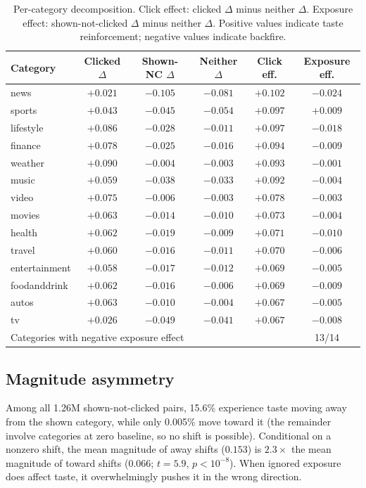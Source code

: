 \documentclass[11pt]{article}
\begin{document}
\begin{table}[ht]
\centering
\caption{Per-category decomposition. Click effect: clicked $\Delta$ minus neither $\Delta$. Exposure effect: shown-not-clicked $\Delta$ minus neither $\Delta$. Positive values indicate taste reinforcement; negative values indicate backfire.}
\label{tab:percat}
\small
\begin{tabular}{lccccc}
\toprule
Category & Clicked $\Delta$ & Shown-NC $\Delta$ & Neither $\Delta$ & Click eff. & Exposure eff. \\
\midrule
news & $+0.021$ & $-0.105$ & $-0.081$ & $+0.102$ & $-0.024$ \\
sports & $+0.043$ & $-0.045$ & $-0.054$ & $+0.097$ & $+0.009$ \\
lifestyle & $+0.086$ & $-0.028$ & $-0.011$ & $+0.097$ & $-0.018$ \\
finance & $+0.078$ & $-0.025$ & $-0.016$ & $+0.094$ & $-0.009$ \\
weather & $+0.090$ & $-0.004$ & $-0.003$ & $+0.093$ & $-0.001$ \\
music & $+0.059$ & $-0.038$ & $-0.033$ & $+0.092$ & $-0.004$ \\
video & $+0.075$ & $-0.006$ & $-0.003$ & $+0.078$ & $-0.003$ \\
movies & $+0.063$ & $-0.014$ & $-0.010$ & $+0.073$ & $-0.004$ \\
health & $+0.062$ & $-0.019$ & $-0.009$ & $+0.071$ & $-0.010$ \\
travel & $+0.060$ & $-0.016$ & $-0.011$ & $+0.070$ & $-0.006$ \\
entertainment & $+0.058$ & $-0.017$ & $-0.012$ & $+0.069$ & $-0.005$ \\
foodanddrink & $+0.062$ & $-0.016$ & $-0.006$ & $+0.069$ & $-0.009$ \\
autos & $+0.063$ & $-0.010$ & $-0.004$ & $+0.067$ & $-0.005$ \\
tv & $+0.026$ & $-0.049$ & $-0.041$ & $+0.067$ & $-0.008$ \\
\midrule
\multicolumn{5}{l}{Categories with negative exposure effect} & 13/14 \\
\bottomrule
\end{tabular}
\end{table}

\subsection*{Magnitude asymmetry}

Among all 1.26M shown-not-clicked pairs, 15.6\% experience taste moving away from the shown category, while only 0.005\% move toward it (the remainder involve categories at zero baseline, so no shift is possible). Conditional on a nonzero shift, the mean magnitude of away shifts ($0.153$) is $2.3\times$ the mean magnitude of toward shifts ($0.066$; $t = 5.9$, $p < 10^{-8}$). When ignored exposure does affect taste, it overwhelmingly pushes it in the wrong direction.
\end{document}
